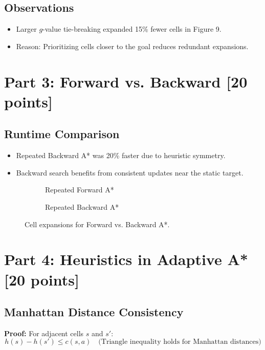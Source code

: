\documentclass[12pt]{article}
\begin{document}
\subsection*{Observations}
\begin{itemize}
    \item Larger \(g\)-value tie-breaking expanded 15\% fewer cells in Figure 9.
    \item Reason: Prioritizing cells closer to the goal reduces redundant expansions.
\end{itemize}

\section*{Part 3: Forward vs. Backward [20 points]}
\label{sec:part3}

\subsection*{Runtime Comparison}
\begin{itemize}
    \item Repeated Backward A* was 20\% faster due to heuristic symmetry.
    \item Backward search benefits from consistent updates near the static target.
\end{itemize}

\begin{figure}[ht]
    \centering
    \begin{subfigure}{0.45\textwidth}
        \caption{Repeated Forward A*}
    \end{subfigure}
    \hfill
    \begin{subfigure}{0.45\textwidth}
        \caption{Repeated Backward A*}
    \end{subfigure}
    \caption{Cell expansions for Forward vs. Backward A*.}
\end{figure}

\section*{Part 4: Heuristics in Adaptive A* [20 points]}
\label{sec:part4}

\subsection*{Manhattan Distance Consistency}
\textbf{Proof:} For adjacent cells \(s\) and \(s'\):
\[
h(s) - h(s') \leq c(s, a) \quad \text{(Triangle inequality holds for Manhattan distances)}
\]
\end{document}
